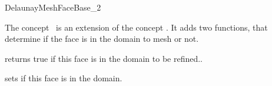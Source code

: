 \begin{ccRefConcept}{DelaunayMeshFaceBase_2}

\ccDefinition

The concept \ccRefName\ is an extension of the concept
. It adds two functions, that determine if the
face is in the domain to mesh or not.\\

\ccRefines
{}


\ccAccessFunctions

{ returns true if this face is in the domain to be refined..}

{ sets if this face is in the domain. }

\ccHasModels
{}

\end{ccRefConcept}

